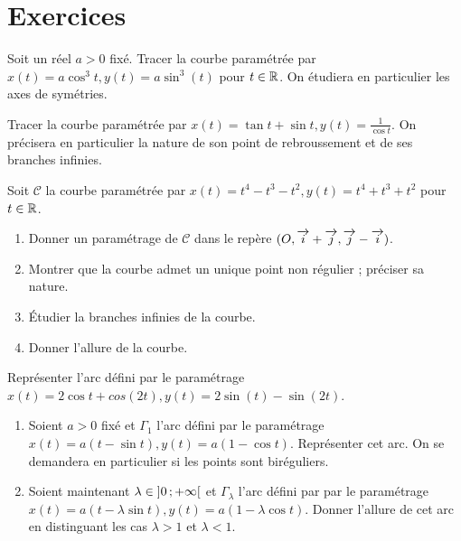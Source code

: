 \section{Exercices}

\begin{exercice}[Astroïde]
  Soit un réel \(a > 0\) fixé. Tracer la courbe paramétrée par \(x(t) = a 
  \cos^3 t, y(t) = a \sin^3(t)\) pour \(t \in \mathbb{R}\). On étudiera en particulier 
  les axes de symétries.
\end{exercice}

\begin{exercice}
  Tracer la courbe paramétrée par \(x(t) = \tan t + \sin t, y(t) = 
  \frac{1}{\cos t}\). On précisera en particulier la nature de son point de 
  rebroussement et de ses branches infinies.
\end{exercice}

\begin{exercice}
  Soit \(\mathcal{C}\) la courbe paramétrée par \(x(t) = t^4 - t^3 - t^2, y(t) 
  = t^4 + t^3 + t^2\) pour \(t \in \mathbb{R}\).
  \begin{enumerate}
    \item Donner un paramétrage de \(\mathcal{C}\) dans le repère \((O, \overrightarrow{i} + 
      \overrightarrow{j}, \overrightarrow{j}-\overrightarrow{i})\).
    \item Montrer que la courbe admet un unique point non régulier ; préciser 
      sa nature.
    \item Étudier la branches infinies de la courbe.
    \item Donner l'allure de la courbe.
  \end{enumerate}
\end{exercice}

\begin{exercice}[Deltoïde]
  Représenter l'arc défini par le paramétrage \(x(t) = 2 \cos t + cos(2t), 
  y(t) = 2\sin(t) - \sin(2t)\).
\end{exercice}

\begin{exercice}[Cycloïde]
  \begin{enumerate}
    \item Soient \(a>0\) fixé et \(\Gamma_1\) l'arc défini par le paramétrage 
      \(x(t) = a(t-\sin t), y(t) = a(1-\cos t)\). Représenter cet arc. On se 
      demandera en particulier si les points sont biréguliers.
    \item Soient maintenant \(\lambda \in \left] 0 \, ;  +\infty \right[\) et 
      \(\Gamma_\lambda\) l'arc défini par par le paramétrage \(x(t) = 
      a(t-\lambda \sin t), y(t) = a(1-\lambda \cos t)\). Donner l'allure de 
      cet arc en distinguant les cas \(\lambda >1\) et \(\lambda < 1\).
  \end{enumerate}
\end{exercice}

